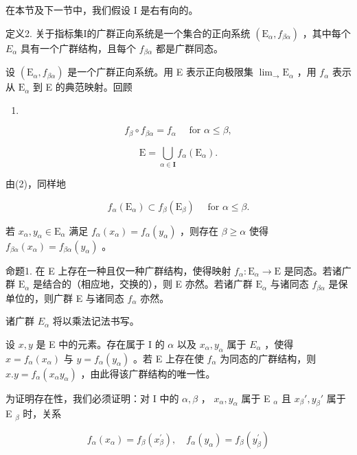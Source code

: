 在本节及下一节中，我们假设 I 是右有向的。

定义2. 关于指标集I的广群正向系统是一个集合的正向系统 \((\mathrm{E}_{\alpha}, f_{\beta\alpha})\) ，其中每个 \(E_{\alpha}\) 具有一个广群结构，且每个 \(f_{\beta\alpha}\) 都是广群同态。

设 \((\mathrm{E}_{\alpha}, f_{\beta\alpha})\) 是一个广群正向系统。用 E 表示正向极限集 \(\lim_{\rightarrow} \mathrm{E}_{\alpha}\) ，用 \(f_{\alpha}\) 表示从 \(\mathrm{E}_{\alpha}\) 到 E 的典范映射。回顾

\begin{enumerate}
\def\labelenumi{(\arabic{enumi})}
\setcounter{enumi}{1}
\tightlist
\item
\end{enumerate}

\[
f _ {\beta} \circ f _ {\beta \alpha} = f _ {\alpha} \quad \text { for } \alpha \leqslant \beta ,\tag{3}
\]

\[
\mathrm{E} = \bigcup_ {\alpha \in \mathbf {I}} f _ {\alpha} (\mathrm{E} _ {\alpha}).
\]

由(2)，同样地

\[
f _ {\alpha} (\mathrm{E} _ {\alpha}) \subset f _ {\beta} (\mathrm{E} _ {\beta}) \quad \text { for } \alpha \leqslant \beta .\tag{4}
\]

若 \(x_{\alpha}, y_{\alpha} \in \mathrm{E}_{\alpha}\) 满足 \(f_{\alpha}(x_{\alpha}) = f_{\alpha}(y_{\alpha})\) ，则存在 \(\beta \geqslant \alpha\) 使得 \(f_{\beta \alpha}(x_{\alpha}) = f_{\beta \alpha}(y_{\alpha})\) 。

命题1. 在 E 上存在一种且仅一种广群结构，使得映射 \(f_{\alpha} \colon \mathrm{E}_{\alpha} \to \mathrm{E}\) 是同态。若诸广群 \(\mathrm{E}_{\alpha}\) 是结合的（相应地，交换的），则 E 亦然。若诸广群 \(\mathrm{E}_{\alpha}\) 与诸同态 \(f_{\beta \alpha}\) 是保单位的，则广群 E 与诸同态 \(f_{\alpha}\) 亦然。

诸广群 \(E_{\alpha}\) 将以乘法记法书写。

设 \(x, y\) 是 E 中的元素。存在属于 I 的 \(\alpha\) 以及 \(x_{\alpha}, y_{\alpha}\) 属于 \(E_{\alpha}\) ，使得 \(x = f_{\alpha}(x_{\alpha})\) 与 \(y = f_{\alpha}(y_{\alpha})\) 。若 E 上存在使 \(f_{\alpha}\) 为同态的广群结构，则 \(x.y = f_{\alpha}(x_{\alpha}y_{\alpha})\) ，由此得该广群结构的唯一性。

为证明存在性，我们必须证明：对 I 中的 \(\alpha, \beta\) ， \(x_{\alpha}, y_{\alpha}\) 属于 E \(_{\alpha}\) 且 \(x_{\beta}', y_{\beta}'\) 属于 E \(_{\beta}\) 时，关系

\[
f _ {\alpha} (x _ {\alpha}) = f _ {\beta} (x _ {\beta} ^ {\prime}), \quad f _ {\alpha} (y _ {\alpha}) = f _ {\beta} (y _ {\beta} ^ {\prime})\tag{5}
\]

